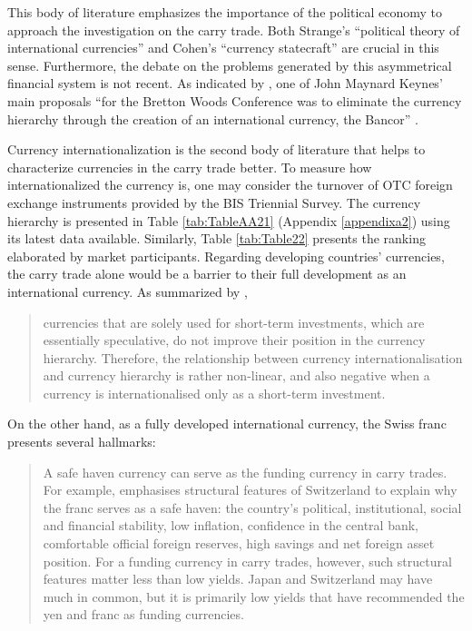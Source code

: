 \documentclass[a4paper, twoside]{templates/ociamthesis}
\begin{document}
This body of literature emphasizes the importance of the political economy to approach the investigation on the carry trade. Both Strange's \autocite*{strange1971} ``political theory of international currencies'' and Cohen's \autocite*{cohen2018} ``currency statecraft'' are crucial in this sense. Furthermore, the debate on the problems generated by this asymmetrical financial system is not recent. As indicated by \textcite[ 184]{depaula2017}, one of John Maynard Keynes' main proposals ``for the Bretton Woods Conference was to eliminate the currency hierarchy through the creation of an international currency, the Bancor'' \autocites*[Keynes][]{keynes1978e,keynes1978d}.

Currency internationalization is the second body of literature that helps to characterize currencies in the carry trade better. To measure how internationalized the currency is, one may consider the turnover of OTC foreign exchange instruments provided by the BIS Triennial Survey. The currency hierarchy is presented in Table \ref{tab:TableAA21} (Appendix \ref{appendixa2}) using its latest data available. Similarly, Table \ref{tab:Table22} presents the ranking elaborated by market participants. Regarding developing countries' currencies, the carry trade alone would be a barrier to their full development as an international currency. As summarized by \textcite[ 197]{orsi2019},

\begin{quote}
currencies that are solely used for short-term investments, which are essentially speculative, do not improve their position in the currency hierarchy. Therefore, the relationship between currency internationalisation and currency hierarchy is rather non-linear, and also negative when a currency is internationalised only as a short-term investment.
\end{quote}

On the other hand, as a fully developed international currency, the Swiss franc presents several hallmarks:

\begin{quote}
A safe haven currency can serve as the funding currency in carry trades. For example, \textcite{jordan2009} emphasises structural features of Switzerland to explain why the franc serves as a safe haven: the country's political, institutional, social and financial stability, low inflation, confidence in the central bank, comfortable official foreign reserves, high savings and net foreign asset position. For a funding currency in carry trades, however, such structural features matter less than low yields. Japan and Switzerland may have much in common, but it is primarily low yields that have recommended the yen and franc as funding currencies. \autocite[ 87]{mccauley2009}
\end{quote}
\end{document}
